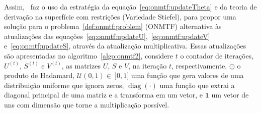 \documentclass[
    12pt,                %
    oneside,            %
    a4paper,            %
    english,            %
    brazil                %
    ]{abntex2ppgsi}
\DeclareMathOperator*{\diag}{diag}
\begin{document}






Assim,~ faz o uso da estratégia da equação~\ref{eq:onmtf:updateTheta} e da teoria de derivação na superfície com restrições (Variedade Stiefel), para propor uma solução para o problema~\ref{def:onmtf:problem} (ONMTF) alternativa às atualizações das equações~\ref{eq:onmtf:updateU},~\ref{eq:onmtf:updateV} e~\ref{eq:onmtf:updateS}, através da atualização multiplicativa.
Essas atualizações são apresentadas no algoritmo~\ref{algo:onmtf2}, considere $t$ o contador de iterações, $U^{(t)}$, $S^{(t)}$ e $V^{(t)}$, as matrizes $U$, $S$ e $V$, na iteração $t$, respectivamente, $\odot$ o produto de Hadamard, $\mathcal{U}(0, 1) \in~]0, 1]$ uma função que gera valores de uma distribuição uniforme que ignora zeros, $\diag( \cdot )$ uma função que extrai a diagonal principal de uma matriz e a transforma em um vetor, e $\mathbf{1}$ um vetor de uns com dimensão que torne a multiplicação possível.
\end{document}
